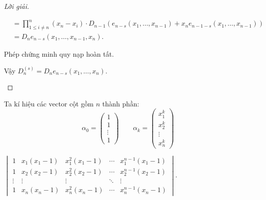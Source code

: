 \documentclass[class=linear-algebra,crop=false]{standalone}
\begin{document}
\begin{proof}[Lời giải]
\begin{enumerate}[label = (\alph*)]
\begin{align*}
			       & = \prod^{n}_{1\le i\ne n}(x_{n} - x_{i})\cdot D_{n-1} \left( e_{n-s}(x_{1}, \ldots, x_{n-1}) + x_{n}e_{n-1-s}(x_{1}, \ldots, x_{n-1}) \right)       \\
			       & = D_{n} e_{n-s}(x_{1}, \ldots, x_{n-1}, x_{n}).
		      \end{align*}
		      \par Phép chứng minh quy nạp hoàn tất.
		      \par Vậy $D^{(s)}_{n} = D_{n}e_{n-s}(x_{1}, \ldots, x_{n})$.
	\end{enumerate}
\end{proof}

\par Ta kí hiệu các vector cột gồm $n$ thành phần:
\[
	\alpha_{0} = \begin{pmatrix}
		1 \\ 1 \\ \vdots \\ 1
	\end{pmatrix}\qquad
	\alpha_{k} = \begin{pmatrix}
		x_{1}^{k} \\ x_{2}^{k} \\ \vdots \\ x_{n}^{k}
	\end{pmatrix}
\]

\begin{exercise}
	$\begin{vmatrix}
			1      & x_{1}(x_{1} - 1) & x_{1}^{2}(x_{1} - 1) & \cdots & x_{1}^{n-1}(x_{1} - 1) \\
			1      & x_{2}(x_{2} - 1) & x_{2}^{2}(x_{2} - 1) & \cdots & x_{2}^{n-1}(x_{2} - 1) \\
			\vdots & \vdots           & \vdots               & \ddots & \vdots                 \\
			1      & x_{n}(x_{n} - 1) & x_{n}^{2}(x_{n} - 1) & \cdots & x_{n}^{n-1}(x_{n} - 1)
		\end{vmatrix}$.
\end{exercise}
\end{document}
